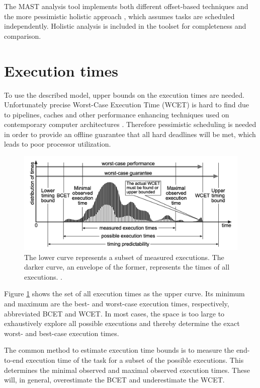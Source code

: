 \documentclass{article}
\begin{document}
The MAST analysis tool implements both different offset-based techniques and the more pessimistic holistic approach \cite{holistic-analysis}, which assumes tasks are scheduled independently. Holistic analysis is included in the toolset for completeness and comparison.

\section{Execution times}

To use the described model, upper bounds on the execution times are needed. Unfortunately precise Worst-Case Execution Time (WCET) is hard to find due to pipelines, caches and other performance enhancing techniques used on contemporary computer architectures \cite{wcet-problem}. Therefore pessimistic scheduling is needed in order to provide an offline guarantee that all hard deadlines will be met, which leads to poor processor utilization.

\begin{figure}[!htbp]
\centering
\includegraphics[width=5in]{images/wcet}
\caption{The lower curve represents a subset of measured executions. The darker curve, an envelope of the former, represents the times of all executions. \cite{wcet-problem}.}
\label{wcet-curve}
\end{figure}

Figure \ref{wcet-curve} shows the set of all execution times as the upper curve. Its minimum and maximum are the best- and worst-case execution times, respectively, abbreviated BCET and WCET. In most cases, the space is too large to exhaustively explore all possible executions and thereby determine the exact worst- and best-case execution times.

The common method to estimate execution time bounds is to measure the end-to-end execution time of the task for a subset of the possible executions. This determines the minimal observed and maximal observed execution times. These will, in general, overestimate the BCET and underestimate the WCET.
\end{document}
